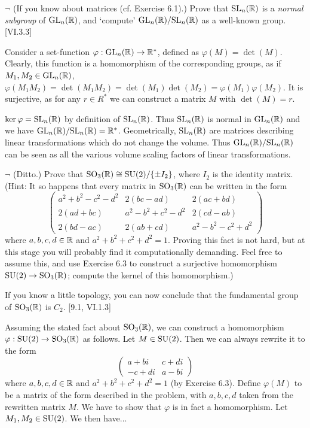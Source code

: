 \begin{problem}
	$\neg$ (If you know about matrices (cf. Exercise 6.1).) Prove that $\mathrm{SL}_n(\mathbb{R})$ is a \emph{normal subgroup} of $\mathrm{GL}_n(\mathbb{R})$, and `compute' $\mathrm{GL}_n(\mathbb{R}) / \mathrm{SL}_n(\mathbb{R})$ as a well-known group. [VI.3.3]
\end{problem}

\begin{solution}
	Consider a set-function $\varphi: \mathrm{GL}_n(\mathbb{R}) \to \mathbb{R}^*$, defined as $\varphi(M) = \det(M)$. Clearly, this function is a homomorphism of the corresponding groups, as if $M_1, M_2 \in \mathrm{GL}_n(\mathbb{R})$, $\varphi(M_ 1 M_2) = \det(M_1 M_2) = \det(M_1) \det(M_2) = \varphi(M_1) \varphi(M_2)$. It is surjective, as for any $r \in R^*$ we can construct a matrix $M$ with $\det(M) = r$.
	
	$\ker \varphi = \mathrm{SL}_n(\mathbb{R})$ by definition of $\mathrm{SL}_n(\mathbb{R})$. Thus $\mathrm{SL}_n(\mathbb{R})$ is normal in $\mathrm{GL}_n(\mathbb{R})$ and we have $\mathrm{GL}_n(\mathbb{R}) / \mathrm{SL}_n(\mathbb{R}) = \mathbb{R}^*$. Geometrically, $\mathrm{SL}_n(\mathbb{R})$ are matrices describing linear transformations which do not change the volume. Thus $\mathrm{GL}_n(\mathbb{R})/\mathrm{SL}_n(\mathbb{R})$ can be seen as all the various volume scaling factors of linear transformations.
\end{solution}

\begin{problem}
	$\neg$ (Ditto.) Prove that $\mathrm{SO}_3(\mathbb{R}) \cong \mathrm{SU}(2)/\{\pm I_2\}$, where $I_2$ is the identity matrix. (Hint: It so happens that every matrix in $\mathrm{SO}_3(\mathbb{R})$ can be written in the form
	\[
		\begin{pmatrix}
			a^2 + b^2 - c^2 - d^2 & 2(bc - ad) & 2(ac + bd) \\
			2(ad + bc) & a^2 - b^2 + c^2 - d^2 & 2(cd - ab) \\
			2(bd - ac) & 2(ab + cd) & a^2 - b^2 - c^2 + d^2
		\end{pmatrix}
	\]
	where $a, b, c, d \in \mathbb{R}$ and $a^2 + b^2 + c^2 + d^2 = 1$. Proving this fact is not hard, but at this stage you will probably find it computationally demanding. Feel free to assume this, and use Exercise 6.3 to construct a surjective homomorphism $\mathrm{SU}(2) \to \mathrm{SO}_3(\mathbb{R})$; compute the kernel of this homomorphism.)
	
	If you know a little topology, you can now conclude that the fundamental group of $\mathrm{SO}_3(\mathbb{R})$ is $C_2$. [9.1, VI.1.3]
\end{problem}

\begin{solution}
	Assuming the stated fact about $\mathrm{SO}_3(\mathbb{R})$, we can construct a homomorphism $\varphi: \mathrm{SU}(2) \to \mathrm{SO}_3(\mathbb{R})$ as follows. Let $M \in \mathrm{SU}(2)$. Then we can always rewrite it to the form
	\[
		\begin{pmatrix}
			a + bi & c + di \\
			-c + di & a - bi
		\end{pmatrix}
	\]
	where $a, b, c, d \in \mathbb{R}$ and $a^2 + b^2 + c^2 + d^2 = 1$ (by Exercise 6.3). Define $\varphi(M)$ to be a matrix of the form described in the problem, with $a, b, c, d$ taken from the rewritten matrix $M$. We have to show that $\varphi$ is in fact a homomorphism. Let $M_1, M_2 \in \mathrm{SU}(2)$. We then have... %
\end{solution}

